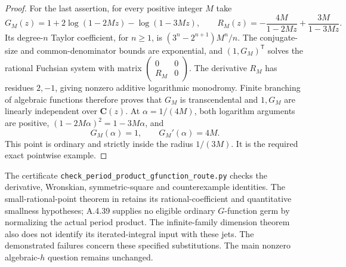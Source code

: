 \begin{proof}
For the last assertion, for every positive integer $M$ take
\[
 G_M(z)=1+2\log(1-2Mz)-\log(1-3Mz),\qquad
 R_M(z)=-\frac{4M}{1-2Mz}+\frac{3M}{1-3Mz}.
\]
Its degree-$n$ Taylor coefficient, for $n\ge1$, is
$(3^n-2^{n+1})M^n/n$. The conjugate-size and common-denominator
bounds are exponential, and $(1,G_M)^{\mathsf T}$ solves the
rational Fuchsian system with matrix
$\left(\begin{smallmatrix}0&0\\R_M&0\end{smallmatrix}\right)$.
The derivative $R_M$ has residues $2,-1$, giving nonzero additive
logarithmic monodromy. Finite branching of algebraic functions
therefore proves that $G_M$ is transcendental and $1,G_M$ are
linearly independent over $\mathbf C(z)$.
At $\alpha=1/(4M)$, both logarithm arguments are positive,
$(1-2M\alpha)^2=1-3M\alpha$, and
\[
 G_M(\alpha)=1,\qquad G_M'(\alpha)=4M.
\]
This point is ordinary and strictly inside the radius $1/(3M)$.
It is the required exact pointwise example.
\end{proof}

The certificate \texttt{check\_period\_product\_gfunction\_route.py}
checks the derivative, Wronskian, symmetric-square and counterexample
identities. The small-rational-point theorem in
\cite[Theorem I, original p.7263]{EllChudnovsky1984PNAS} retains its
rational-coefficient and quantitative smallness hypotheses;
A.4.39 supplies no eligible ordinary $G$-function germ by normalizing
the actual period product. The infinite-family dimension theorem
\cite[Theorem 3, p.4 of the opened manuscript]{EllFischlerRivoal2018GValues}
also does not identify its iterated-integral input with these jets.
The demonstrated failures concern these specified substitutions.
The main nonzero algebraic-$h$ question remains unchanged.


